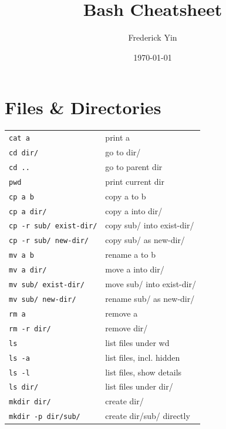 \documentclass[a4paper, twocolumn]{article}
\title{Bash Cheatsheet}
\author{Frederick Yin}
\date{\today}
\renewcommand{\tt}{\texttt}
\begin{document}
\maketitle

\section{Files \& Directories}
\begin{tabular}{ll}
    \tt{cat a}              & print a                               \\
    \tt{cd dir/}            & go to dir/                            \\
    \tt{cd ..}              & go to parent dir                      \\
    \tt{pwd}                & print current dir                     \\
    \tt{cp a b}             & copy a to b                           \\
    \tt{cp a dir/}          & copy a into dir/                      \\
    \tt{cp -r sub/ exist-dir/}    & copy sub/ into exist-dir/       \\
    \tt{cp -r sub/ new-dir/} & copy sub/ as new-dir/                \\
    \tt{mv a b}             & rename a to b                         \\
    \tt{mv a dir/}          & move a into dir/                      \\
    \tt{mv sub/ exist-dir/}       & move sub/ into exist-dir/       \\
    \tt{mv sub/ new-dir/}   & rename sub/ as new-dir/               \\
    \tt{rm a}               & remove a                              \\
    \tt{rm -r dir/}         & remove dir/                           \\
    \tt{ls}                 & list files under wd                   \\
    \tt{ls -a}              & list files, incl. hidden              \\
    \tt{ls -l}              & list files, show details              \\
    \tt{ls dir/}            & list files under dir/                 \\
    \tt{mkdir dir/}         & create dir/                           \\
    \tt{mkdir -p dir/sub/}  & create dir/sub/ directly
\end{tabular}
\end{document}

